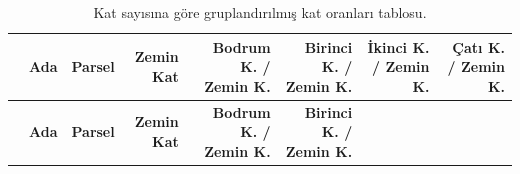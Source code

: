 \documentclass[12pt,turkish,a4paperpaper,]{report}
\begin{document}
\begin{longtable}[]{@{}lrrrrrrr@{}}
\caption{Kat sayısına göre gruplandırılmış kat oranları
tablosu.}\tabularnewline
\toprule
\begin{minipage}[b]{0.02\columnwidth}\raggedright
\strut
\end{minipage} & \begin{minipage}[b]{0.04\columnwidth}\raggedleft
\textbf{Ada}\strut
\end{minipage} & \begin{minipage}[b]{0.04\columnwidth}\raggedleft
\textbf{Parsel}\strut
\end{minipage} & \begin{minipage}[b]{0.14\columnwidth}\raggedleft
\textbf{Zemin Kat}\strut
\end{minipage} & \begin{minipage}[b]{0.14\columnwidth}\raggedleft
\textbf{Bodrum K. / Zemin K.}\strut
\end{minipage} & \begin{minipage}[b]{0.14\columnwidth}\raggedleft
\textbf{Birinci K. / Zemin K.}\strut
\end{minipage} & \begin{minipage}[b]{0.14\columnwidth}\raggedleft
\textbf{İkinci K. / Zemin K.}\strut
\end{minipage} & \begin{minipage}[b]{0.12\columnwidth}\raggedleft
\textbf{Çatı K. / Zemin K.}\strut
\end{minipage}\tabularnewline
\midrule
\endfirsthead
\toprule
\begin{minipage}[b]{0.02\columnwidth}\raggedright
\strut
\end{minipage} & \begin{minipage}[b]{0.04\columnwidth}\raggedleft
\textbf{Ada}\strut
\end{minipage} & \begin{minipage}[b]{0.04\columnwidth}\raggedleft
\textbf{Parsel}\strut
\end{minipage} & \begin{minipage}[b]{0.14\columnwidth}\raggedleft
\textbf{Zemin Kat}\strut
\end{minipage} & \begin{minipage}[b]{0.14\columnwidth}\raggedleft
\textbf{Bodrum K. / Zemin K.}\strut
\end{minipage} & \begin{minipage}[b]{0.14\columnwidth}\raggedleft
\textbf{Birinci K. / Zemin K.}\strut
\end{minipage} & \begin{minipage}[b]{0.14\columnwidth}\raggedleft

\end{minipage}
\end{longtable}
\end{document}
